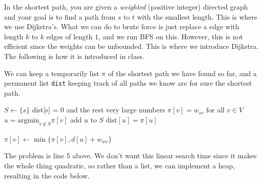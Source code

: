   In the shortest path, you are given a \textit{weighted} (positive integer) directed graph and your goal is to find a path from $s$ to $t$ with the smallest length. This is where we use Dijkstra's. What we can do to brute force is just replace a edge with length $k$ to $k$ edges of length $1$, and we run BFS on this. However, this is not efficient since the weights can be unbounded. This is where we introduce Dijkstra. The following is how it is introduced in class. 

  \begin{algo}
    We can keep a temporarily list $\pi$ of the shortest path we have found so far, and a permanent list \texttt{dist} keeping track of all paths we know are for sure the shortest path. 
    \begin{algorithm}[H]
      \label{alg:dik_in_class}
      \begin{algorithmic}[1]
        \State $S \gets \{s\}$  
        \State dist[s] = 0 and the rest very large numbers 
        \State $\pi[v] = w_{sv}$ for all $v \in V$ 
          \State $u = \mathrm{argmin}_{v \notin S} \pi[v]$ 
          \State add $u$ to $S$ 
          \State $\mathrm{dist}[u] = \pi[u]$ 
          
           
            \State $\pi[v] \gets \min\{\pi[v], d[u] + w_{wv}\}$ 
          \EndFor
        \EndFunction
      \end{algorithmic}
    \end{algorithm}
  \end{algo}

  The problem is line 5 above. We don't want this linear search time since it makes the whole thing quadratic, so rather than a list, we can implement a heap, resulting in the code below. 

